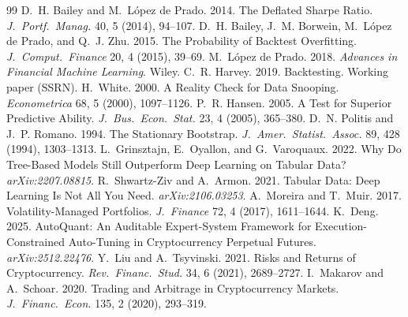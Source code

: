 \documentclass[sigconf,anonymous]{acmart}
\begin{document}

\begin{thebibliography}{99}
\small
{} D.~H. Bailey and M.~L\'opez de Prado. 2014. The Deflated Sharpe Ratio. \emph{J.\ Portf.\ Manag.} 40, 5 (2014), 94–107.
 D.~H. Bailey, J.~M. Borwein, M.~L\'opez de Prado, and Q.~J. Zhu. 2015. The Probability of Backtest Overfitting. \emph{J.\ Comput.\ Finance} 20, 4 (2015), 39–69.
 M.~L\'opez de Prado. 2018. \emph{Advances in Financial Machine Learning}. Wiley.
 C.~R. Harvey. 2019. Backtesting. Working paper (SSRN).
 H.~White. 2000. A Reality Check for Data Snooping. \emph{Econometrica} 68, 5 (2000), 1097–1126.
 P.~R. Hansen. 2005. A Test for Superior Predictive Ability. \emph{J.\ Bus.\ Econ.\ Stat.} 23, 4 (2005), 365–380.
 D.~N. Politis and J.~P. Romano. 1994. The Stationary Bootstrap. \emph{J.\ Amer.\ Statist.\ Assoc.} 89, 428 (1994), 1303–1313.
 L.~Grinsztajn, E.~Oyallon, and G.~Varoquaux. 2022. Why Do Tree-Based Models Still Outperform Deep Learning on Tabular Data? \emph{arXiv:2207.08815}.
 R.~Shwartz-Ziv and A.~Armon. 2021. Tabular Data: Deep Learning Is Not All You Need. \emph{arXiv:2106.03253}.
 A.~Moreira and T.~Muir. 2017. Volatility-Managed Portfolios. \emph{J.\ Finance} 72, 4 (2017), 1611–1644.
 K.~Deng. 2025. AutoQuant: An Auditable Expert-System Framework for Execution-Constrained Auto-Tuning in Cryptocurrency Perpetual Futures. \emph{arXiv:2512.22476}.
 Y.~Liu and A.~Tsyvinski. 2021. Risks and Returns of Cryptocurrency. \emph{Rev.\ Financ.\ Stud.} 34, 6 (2021), 2689–2727.
 I.~Makarov and A.~Schoar. 2020. Trading and Arbitrage in Cryptocurrency Markets. \emph{J.\ Financ.\ Econ.} 135, 2 (2020), 293–319.
\end{thebibliography}
\end{document}
